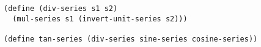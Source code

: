 \documentclass[a4paper,12pt]{article}
\begin{document}
\begin{lstlisting}
(define (div-series s1 s2)
  (mul-series s1 (invert-unit-series s2)))

(define tan-series (div-series sine-series cosine-series))
\end{lstlisting}
\end{document}
